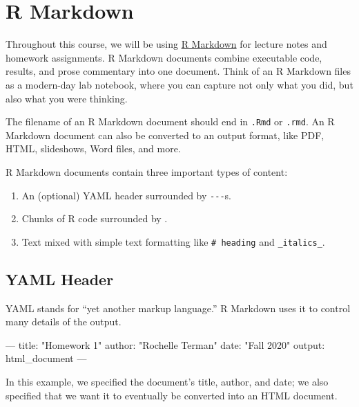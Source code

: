 \documentclass[]{book}
\newenvironment{Shaded}{\begin{snugshade}}{\end{snugshade}}
\newcommand{\NormalTok}[1]{#1}
\providecommand{\tightlist}{%
  \setlength{\itemsep}{0pt}\setlength{\parskip}{0pt}}
\begin{document}
\hypertarget{r-markdown}{\section{R Markdown}\label{r-markdown}}

Throughout this course, we will be using
\href{http://rmarkdown.rstudio.com\%3E}{R Markdown} for lecture notes
and homework assignments. R Markdown documents combine executable code,
results, and prose commentary into one document. Think of an R Markdown
files as a modern-day lab notebook, where you can capture not only what
you did, but also what you were thinking.

The filename of an R Markdown document should end in \texttt{.Rmd} or
\texttt{.rmd}. An R Markdown document can also be converted to an output
format, like PDF, HTML, slideshows, Word files, and more.

R Markdown documents contain three important types of content:

\begin{enumerate}
\def\labelenumi{\arabic{enumi}.}
\tightlist
\item
  An (optional) YAML header surrounded by \texttt{-\/-\/-}s.
\item
  Chunks of R code surrounded by
  \texttt{\textasciigrave{}\textasciigrave{}\textasciigrave{}}.
\item
  Text mixed with simple text formatting like \texttt{\#\ heading} and
  \texttt{\_italics\_}.
\end{enumerate}

\subsection{YAML Header}\label{yaml-header}

YAML stands for ``yet another markup language.'' R Markdown uses it to
control many details of the output.

\begin{Shaded}
\begin{Highlighting}[]
\NormalTok{---}
\NormalTok{title: "Homework 1"}
\NormalTok{author: "Rochelle Terman"}
\NormalTok{date: "Fall 2020"}
\NormalTok{output: html_document}
\NormalTok{---}
\end{Highlighting}
\end{Shaded}

In this example, we specified the document's title, author, and date; we
also specified that we want it to eventually be converted into an HTML
document.
\end{document}
